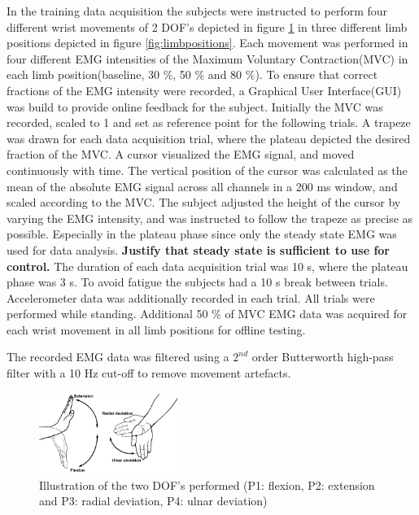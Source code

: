In the training data acquisition the subjects were instructed to perform four different wrist movements of 2 DOF's depicted in figure \ref{fig:wristmovement} in three different limb positions depicted in figure \ref{fig:limbpositions}. Each movement was performed in four different EMG intensities of the Maximum Voluntary Contraction(MVC) in each limb position(baseline, 30 \%, 50 \% and 80 \%). To ensure that correct fractions of the EMG intensity were recorded, a Graphical User Interface(GUI) was build to provide online feedback for the subject. Initially the MVC was recorded, scaled to 1 and set as reference point for the following trials. A trapeze was drawn for each data acquisition trial, where the plateau depicted the desired fraction of the MVC. A cursor visualized the EMG signal, and moved continuously with time. The vertical position of the cursor was calculated as the mean of the absolute EMG signal across all channels in a 200 ms window, and scaled according to the MVC. The subject adjusted the height of the cursor by varying the EMG intensity, and was instructed to follow the trapeze as precise as possible. Especially in the plateau phase since only the steady state EMG was used for data analysis. \textbf{Justify that steady state is sufficient to use for control.} The duration of each data acquisition trial was 10 s, where the plateau phase was 3 s. To avoid fatigue the subjects had a 10 s break between trials. Accelerometer data was additionally recorded in each trial. All trials were performed while standing.
Additional 50 \% of MVC EMG data was acquired for each wrist movement in all limb positions for offline testing.

The recorded EMG data was filtered using a $2^{nd}$ order Butterworth high-pass filter with a 10 Hz cut-off to remove movement artefacts. 

\begin{figure}[thpb]
	\centering
	\includegraphics[width=0.4\textwidth]{Figures/wristmovement}  %
	\caption{Illustration of the two DOF's performed (P1: flexion, P2: extension and P3: radial deviation, P4: ulnar deviation)}
	\label{fig:wristmovement}  %
\end{figure}

